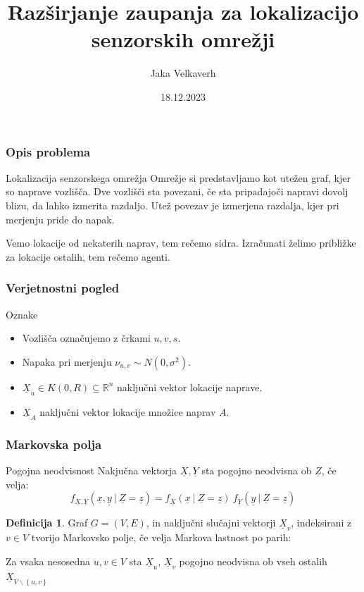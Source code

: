 \documentclass{beamer}
\title[Razširjanje zaupanja]{Razširjanje zaupanja za lokalizacijo senzorskih omrežji}
\author{Jaka Velkaverh}
\date{18.12.2023}
\theoremstyle{definition}
\newtheorem{definicija}{Definicija}
\begin{document}
	\frame{\titlepage}

	\begin{frame}
		\frametitle{Opis problema}
		\begin{block}{Lokalizacija senzorskega omrežja}
			Omrežje si predstavljamo kot utežen graf, kjer so naprave vozlišča.
			Dve vozlišči sta povezani, če sta pripadajoči napravi dovolj blizu,
			da lahko izmerita razdaljo. Utež povezav je izmerjena razdalja,
			kjer pri merjenju pride do napak.

			Vemo lokacije od nekaterih naprav, tem rečemo sidra. Izračunati
			želimo približke za lokacije ostalih, tem rečemo agenti.
		\end{block}
	\end{frame}
	\begin{frame}
		\frametitle{Verjetnostni pogled}
		Oznake
		\begin{itemize}
			\item Vozlišča označujemo z črkami $u, v, s$.
			\item Napaka pri merjenju $\nu_{u, v} \sim N\left(0, \sigma^2\right)$.
			\item $\underline{X}_u \in K\left(0,R\right) \subseteq \mathbb{R}^n$ naključni vektor lokacije naprave.
			\item $\underline{X}_A$ naključni vektor lokacije množice naprav $A$.
		\end{itemize}
	\end{frame}

	\begin{frame}
		\frametitle{Markovska polja}
		\begin{block}{Pogojna neodvisnost}
			Nakjučna vektorja $\underline{X}, \underline{Y}$ sta pogojno
			neodvisna ob $\underline{Z}$, če velja:
			$$f_{\underline{X}, \underline{Y}}\left(\underline{x}, \underline{y}\ |\ \underline{Z} = \underline{z}\right) =
			  f_{\underline{X}}\left(\underline{x}\ |\ \underline{Z} = \underline{z}\right) \
			  f_{\underline{Y}}\left(\underline{y}\ |\ \underline{Z} = \underline{z}\right)
			$$
		\end{block}
		\pause
		\begin{definicija}
			Graf $G = \left(V, E\right)$, in naključni slučajni vektorji
			$\underline{X}_v$, indeksirani z $v \in V$ tvorijo Markovsko polje,
			če velja Markova lastnost po parih:

			Za vsaka nesosedna $u, v \in V$ sta $\underline{X}_u$, $\underline{X}_v$
			pogojno neodvisna ob vseh ostalih
			$\underline{X}_{V\backslash\left\{u, v\right\}}$
		\end{definicija}
	\end{frame}
\end{document}
